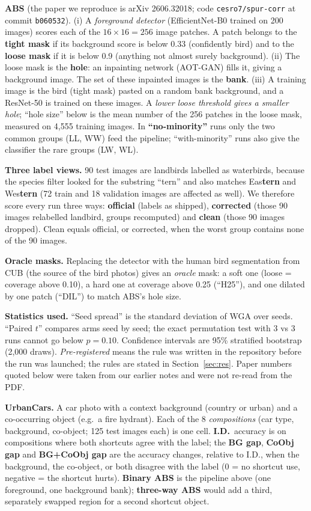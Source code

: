 \documentclass[runningheads]{llncs}
\begin{document}
\textbf{ABS} (the paper we reproduce is arXiv 2606.32018; code \texttt{cesro7/spur-corr} at commit \texttt{b060532}). (i) A \emph{foreground detector} (EfficientNet-B0 trained on 200 images) scores each of the $16\times16=256$ image patches. A patch belongs to the \textbf{tight mask} if its background score is below 0.33 (confidently bird) and to the \textbf{loose mask} if it is below 0.9 (anything not almost surely background). (ii) The loose mask is the \textbf{hole}: an inpainting network (AOT-GAN) fills it, giving a background image. The set of these inpainted images is the \textbf{bank}. (iii) A training image is the bird (tight mask) pasted on a random bank background, and a ResNet-50 is trained on these images. A \emph{lower loose threshold gives a smaller hole}; ``hole size'' below is the mean number of the 256 patches in the loose mask, measured on 4{,}555 training images. In \textbf{``no-minority''} runs only the two common groups (LL, WW) feed the pipeline; ``with-minority'' runs also give the classifier the rare groups (LW, WL).

\textbf{Three label views.} 90 test images are landbirds labelled as waterbirds, because the species filter looked for the substring ``tern'' and also matches Eas\textbf{tern} and Wes\textbf{tern} (72 train and 18 validation images are affected as well). We therefore score every run three ways: \textbf{official} (labels as shipped), \textbf{corrected} (those 90 images relabelled landbird, groups recomputed) and \textbf{clean} (those 90 images dropped). Clean equals official, or corrected, when the worst group contains none of the 90 images.

\textbf{Oracle masks.} Replacing the detector with the human bird segmentation from CUB (the source of the bird photos) gives an \emph{oracle} mask: a soft one (loose = coverage above 0.10), a hard one at coverage above 0.25 (``H25''), and one dilated by one patch (``DIL'') to match ABS's hole size.

\textbf{Statistics used.} ``Seed spread'' is the standard deviation of WGA over seeds. ``Paired $t$'' compares arms seed by seed; the exact permutation test with 3 vs 3 runs cannot go below $p=0.10$. Confidence intervals are 95\% stratified bootstrap (2{,}000 draws). \emph{Pre-registered} means the rule was written in the repository before the run was launched; the rules are stated in Section~\ref{sec:res}. Paper numbers quoted below were taken from our earlier notes and were not re-read from the PDF.

\textbf{UrbanCars.} A car photo with a context background (country or urban) and a co-occurring object (e.g.\ a fire hydrant). Each of the 8 \emph{compositions} (car type, background, co-object; 125 test images each) is one cell. \textbf{I.D.}\ accuracy is on compositions where both shortcuts agree with the label; the \textbf{BG gap}, \textbf{CoObj gap} and \textbf{BG+CoObj gap} are the accuracy changes, relative to I.D., when the background, the co-object, or both disagree with the label (0 = no shortcut use, negative = the shortcut hurts). \textbf{Binary ABS} is the pipeline above (one foreground, one background bank); \textbf{three-way ABS} would add a third, separately swapped region for a second shortcut object.
\end{document}
